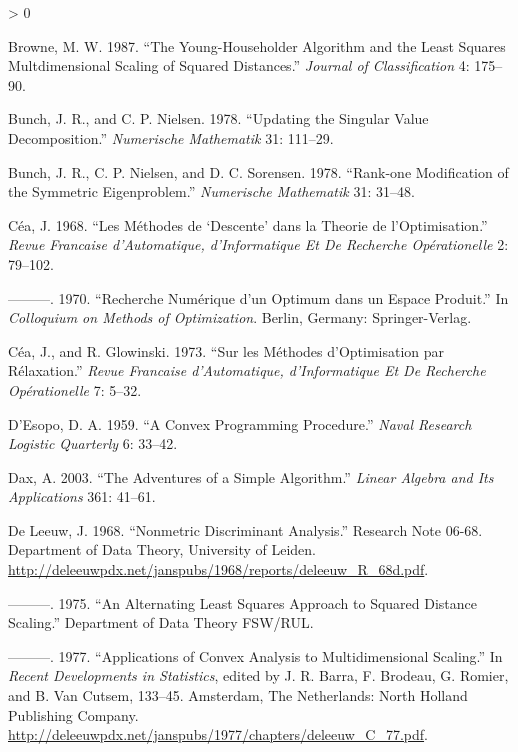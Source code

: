 \documentclass[
  12pt,
]{book}
\newlength{\cslhangindent}
\newenvironment{CSLReferences}[2] %
 {%
  \setlength{\parindent}{0pt}
  \ifodd #1 \everypar{\setlength{\hangindent}{\cslhangindent}}\ignorespaces\fi
  \ifnum #2 > 0
  \setlength{\parskip}{#2\baselineskip}
  \fi
 }%
 {}
\begin{document}
\begin{CSLReferences}{1}{0}
\leavevmode\hypertarget{ref-browne_87}{}%
Browne, M. W. 1987. {``{The Young-Householder Algorithm and the Least Squares Multdimensional Scaling of Squared Distances}.''} \emph{Journal of Classification} 4: 175--90.

\leavevmode\hypertarget{ref-bunch_nielsen_78}{}%
Bunch, J. R., and C. P. Nielsen. 1978. {``{Updating the Singular Value Decomposition}.''} \emph{Numerische Mathematik} 31: 111--29.

\leavevmode\hypertarget{ref-bunch_nielsen_sorensen_78}{}%
Bunch, J. R., C. P. Nielsen, and D. C. Sorensen. 1978. {``{Rank-one Modification of the Symmetric Eigenproblem}.''} \emph{Numerische Mathematik} 31: 31--48.

\leavevmode\hypertarget{ref-cea_68}{}%
Céa, J. 1968. {``{Les Méthodes de {`Descente'} dans la Theorie de l'Optimisation}.''} \emph{Revue Francaise d'Automatique, d'Informatique Et De Recherche Opérationelle} 2: 79--102.

\leavevmode\hypertarget{ref-cea_70}{}%
---------. 1970. {``{Recherche Numérique d'un Optimum dans un Espace Produit}.''} In \emph{Colloquium on Methods of Optimization}. Berlin, Germany: Springer-Verlag.

\leavevmode\hypertarget{ref-cea_glowinski_73}{}%
Céa, J., and R. Glowinski. 1973. {``{Sur les Méthodes d'Optimisation par Rélaxation}.''} \emph{Revue Francaise d'Automatique, d'Informatique Et De Recherche Opérationelle} 7: 5--32.

\leavevmode\hypertarget{ref-desopo_59}{}%
D'Esopo, D. A. 1959. {``{A Convex Programming Procedure}.''} \emph{Naval Research Logistic Quarterly} 6: 33--42.

\leavevmode\hypertarget{ref-dax_03}{}%
Dax, A. 2003. {``{The Adventures of a Simple Algorithm}.''} \emph{Linear Algebra and Its Applications} 361: 41--61.

\leavevmode\hypertarget{ref-deleeuw_R_68d}{}%
De Leeuw, J. 1968. {``Nonmetric Discriminant Analysis.''} Research Note 06-68. Department of Data Theory, University of Leiden. \url{http://deleeuwpdx.net/janspubs/1968/reports/deleeuw_R_68d.pdf}.

\leavevmode\hypertarget{ref-deleeuw_U_75b}{}%
---------. 1975. {``{An Alternating Least Squares Approach to Squared Distance Scaling}.''} Department of Data Theory FSW/RUL.

\leavevmode\hypertarget{ref-deleeuw_C_77}{}%
---------. 1977. {``Applications of Convex Analysis to Multidimensional Scaling.''} In \emph{Recent Developments in Statistics}, edited by J. R. Barra, F. Brodeau, G. Romier, and B. Van Cutsem, 133--45. Amsterdam, The Netherlands: North Holland Publishing Company. \url{http://deleeuwpdx.net/janspubs/1977/chapters/deleeuw_C_77.pdf}.


\end{CSLReferences}
\end{document}

